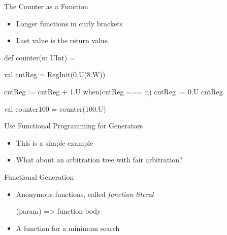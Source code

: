 \begin{frame}[fragile]{The Counter as a Function}
\begin{itemize}
\item Longer functions in curly brackets
\item Last value is the return value
\end{itemize}
\begin{chisel}
def counter(n: UInt) = {
  
  val cntReg = RegInit(0.U(8.W))
  
  cntReg := cntReg + 1.U
  when(cntReg === n) {
    cntReg := 0.U
  }
  cntReg
}

val counter100 = counter(100.U)
\end{chisel}
\end{frame}






\begin{frame}[fragile]{Use Functional Programming for Generators}
\begin{itemize}
\item This is a simple example
\item What about an arbitration tree with fair arbitration?
\end{itemize}
\end{frame}

\begin{frame}[fragile]{Functional Generation}
\begin{itemize}
\item Anonymous functions, called \emph{function literal}
\begin{chisel}
  (param) => function body
\end{chisel}
\item A function for a minimum search
\end{itemize}
\end{frame}

